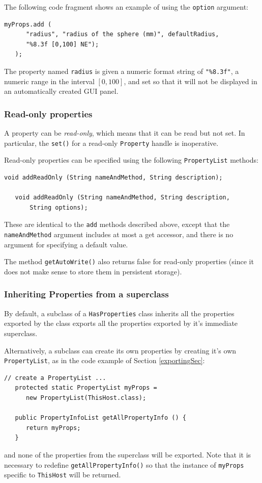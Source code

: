 \documentclass{article}
\begin{document}
The following code fragment shows an example of using the {\tt option}
argument:
\begin{lstlisting}[]
   myProps.add (
      "radius", "radius of the sphere (mm)", defaultRadius,
      "%8.3f [0,100] NE");
   );
\end{lstlisting}
The property named {\tt radius} is given a numeric format string of
{\tt "\%8.3f"}, a numeric range in the interval $[0, 100]$, and set so
that it will not be displayed in an automatically created GUI panel.

\subsubsection{Read-only properties}

A property can be {\it read-only}, which means that it can be read but
not set. In particular, the {\tt set()} for a read-only {\tt Property}
handle is inoperative.

Read-only properties can be specified using the following
{\tt PropertyList} methods:

\begin{lstlisting}[]
   void addReadOnly (String nameAndMethod, String description);

   void addReadOnly (String nameAndMethod, String description, 
       String options);
\end{lstlisting}
These are identical to the {\tt add} methods described above, except
that the {\tt nameAndMethod} argument includes at most a get accessor,
and there is no argument for specifying a default value.

The method {\tt getAutoWrite()} also returns false for read-only
properties (since it does not make sense to store them in persistent
storage).

\subsubsection{Inheriting Properties from a superclass}

By default, a subclass of a {\tt HasProperties} class inherits all the
properties exported by the class exports all the properties exported
by it's immediate superclass.

Alternatively, a subclass can create its own properties by creating
it's own {\tt PropertyList}, as in the code example of 
Section \ref{exportingSec}:
\begin{lstlisting}[]
   // create a PropertyList ...
   protected static PropertyList myProps = 
      new PropertyList(ThisHost.class);

   public PropertyInfoList getAllPropertyInfo () {
      return myProps;
   }
\end{lstlisting}
and none of the properties from the superclass will be exported.  Note
that it is necessary to redefine {\tt getAllPropertyInfo()} so that the
instance of {\tt myProps} specific to {\tt ThisHost} will be returned.
\end{document}
